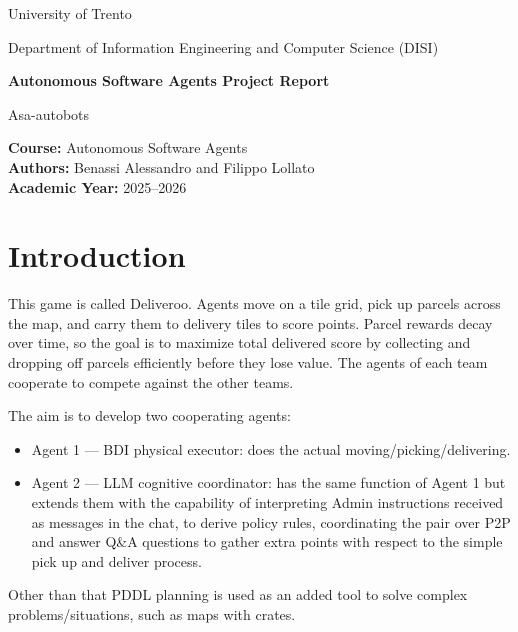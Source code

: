 \documentclass[a4paper,11pt]{article}
\begin{document}
\begin{titlepage}
    \centering

    {\Large University of Trento \par}
    \vspace{0.5cm}

    {\large Department of Information Engineering and Computer Science (DISI)\par}

    \vspace{2cm}

    {\Huge \textbf{Autonomous Software Agents Project Report}\par}

    \vspace{0.5cm}

    {\Large Asa-autobots\par}

    \vfill

    \begin{flushleft}
    \textbf{Course:} Autonomous Software Agents\\
    \textbf{Authors:} Benassi Alessandro and Filippo Lollato\\
    \textbf{Academic Year:} 2025--2026
    \end{flushleft}

    \vfill

\end{titlepage}


\tableofcontents
\newpage



\section{Introduction}
This game is called Deliveroo. Agents move on a tile grid, pick up parcels across the map, 
and carry them to delivery tiles to score points. 
Parcel rewards decay over time, so the goal is to maximize total delivered score by collecting
and dropping off parcels efficiently before they lose value. 
The agents of each team cooperate to compete against the other teams.

The aim is to develop two cooperating agents:
\begin{itemize}
\item Agent 1 — BDI physical executor: does the actual moving/picking/delivering.
\item Agent 2 — LLM cognitive coordinator: has the same function of Agent 1 but extends them with the capability 
of interpreting Admin instructions received as messages in the chat, to derive policy rules, coordinating the pair 
over P2P and answer Q\&A questions to gather extra points with respect to the simple pick up and deliver process.
\end{itemize}
Other than that PDDL planning is used as an added tool to solve complex problems/situations, such as maps with crates.
\end{document}
